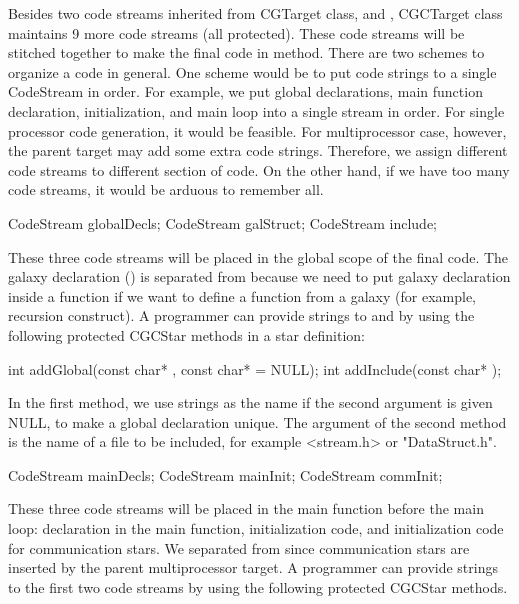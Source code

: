 {Besides two code streams inherited from CGTarget class,  and
, CGCTarget class maintains 9 more code streams (all
protected). These
code streams will be stitched together to make the final code in
 method. There are two schemes to organize a code in general.
One scheme would be to put code strings to a single CodeStream in order.
For example, we put global declarations, main function declaration, 
initialization, and main loop into a single  stream in order.
For single processor code generation, it would be feasible. For
multiprocessor case, however, the parent target may add some extra code
strings. Therefore, we assign different code streams to different
section of code. On the other hand, if we have too many code streams,
it would be arduous to remember all. 

\begin{example}
CodeStream globalDecls;
CodeStream galStruct;
CodeStream include;
\end{example}

These three code streams will be placed in the global scope of the final code.
The galaxy declaration () is separated from 
because we need to put galaxy declaration inside a function if we want to
define a function from a galaxy (for example, recursion construct).
A programmer can provide strings to  and 
by using the following protected CGCStar methods in a star definition:

\begin{example}
int addGlobal(const char* , const char*  = NULL);
int addInclude(const char* );
\end{example}

In the first method, we use  strings as the name if the second
argument is given NULL, to make a global declaration unique.
The argument of the second method is the name of a file to be included, for
example <stream.h> or "DataStruct.h".

\begin{example}
CodeStream mainDecls;
CodeStream mainInit;
CodeStream commInit;
\end{example}

These three code streams will be placed in the main function before the
main loop: declaration in the main function, initialization code, and
initialization code for communication stars. We separated 
from  since communication stars are inserted by the parent
multiprocessor target.
A programmer can provide strings to the first
two code streams by using the following protected CGCStar methods.

}
